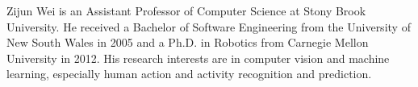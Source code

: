\documentclass[10pt,journal,compsoc]{IEEEtran}
\begin{document}

%



%
%
%
%
%
% 

 \begin{IEEEbiography}{Zijun Wei}
is an Assistant Professor of Computer Science at Stony Brook University. He received a Bachelor of Software Engineering from the University of New South Wales in 2005 and a Ph.D. in Robotics from Carnegie Mellon University in 2012. His research interests are in computer vision and machine learning, especially human action and activity recognition and prediction. 
\end{IEEEbiography}
\end{document}
